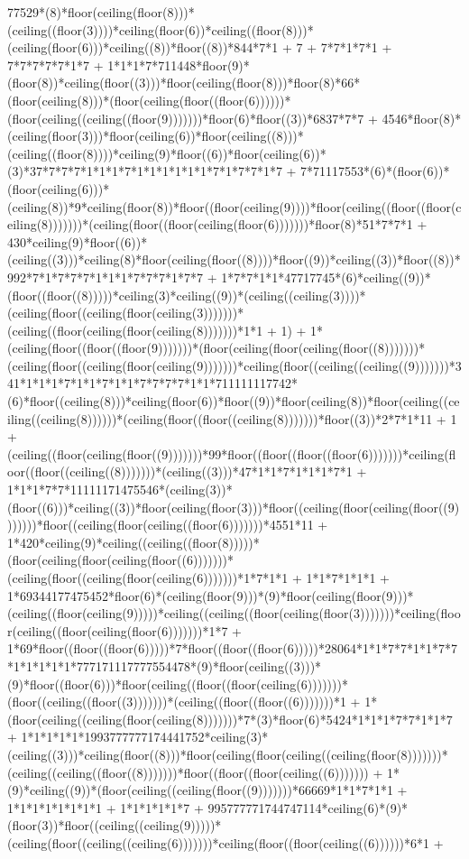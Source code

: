 77529*(8)*floor(ceiling(floor(8)))*(ceiling((floor(3))))*ceiling(floor(6))*ceiling((floor(8)))*(ceiling(floor(6)))*ceiling((8))*floor((8))*844*7*1 + 7 + 7*7*1*7*1 + 7*7*7*7*7*1*7 + 1*1*1*7*711448*floor(9)*(floor(8))*ceiling(floor((3)))*floor(ceiling(floor(8)))*floor(8)*66*(floor(ceiling(8)))*(floor(ceiling(floor((floor(6))))))*(floor(ceiling((ceiling((floor(9)))))))*floor(6)*floor((3))*6837*7*7 + 4546*floor(8)*(ceiling(floor(3)))*floor(ceiling(6))*floor(ceiling((8)))*(ceiling((floor(8))))*ceiling(9)*floor((6))*floor(ceiling(6))*(3)*37*7*7*7*1*1*1*7*1*1*1*1*1*1*7*1*7*7*1*7 + 7*71117553*(6)*(floor(6))*(floor(ceiling(6)))*(ceiling(8))*9*ceiling(floor(8))*floor((floor(ceiling(9))))*floor(ceiling((floor((floor(ceiling(8)))))))*(ceiling(floor((floor(ceiling(floor(6)))))))*floor(8)*51*7*7*1 + 430*ceiling(9)*floor((6))*(ceiling((3)))*ceiling(8)*floor(ceiling(floor((8))))*floor((9))*ceiling((3))*floor((8))*992*7*1*7*7*7*1*1*1*7*7*7*1*7*7 + 1*7*7*1*1*47717745*(6)*ceiling((9))*(floor((floor((8)))))*ceiling(3)*ceiling((9))*(ceiling((ceiling(3))))*(ceiling(floor((ceiling(floor(ceiling(3)))))))*(ceiling((floor(ceiling(floor(ceiling(8)))))))*1*1 + 1) + 1*(ceiling(floor((floor((floor(9)))))))*(floor(ceiling(floor(ceiling(floor((8)))))))*(ceiling(floor((ceiling(floor(ceiling(9)))))))*ceiling(floor((ceiling((ceiling((9)))))))*341*1*1*1*7*1*1*7*1*1*7*7*7*7*1*1*711111117742*(6)*floor((ceiling(8)))*ceiling(floor(6))*floor((9))*floor(ceiling(8))*floor(ceiling((ceiling((ceiling(8))))))*(ceiling(floor((floor((ceiling(8)))))))*floor((3))*2*7*1*11 + 1 + (ceiling((floor(ceiling(floor((9)))))))*99*floor((floor((floor((floor(6)))))))*ceiling(floor((floor((ceiling((8)))))))*(ceiling((3)))*47*1*1*7*1*1*1*7*1 + 1*1*1*7*7*11111171475546*(ceiling(3))*(floor((6)))*ceiling((3))*floor(ceiling(floor(3)))*floor((ceiling(floor(ceiling(floor((9)))))))*floor((ceiling(floor(ceiling((floor(6)))))))*4551*11 + 1*420*ceiling(9)*ceiling((ceiling((floor(8)))))*(floor(ceiling(floor(ceiling(floor((6)))))))*(ceiling(floor((ceiling(floor(ceiling(6)))))))*1*7*1*1 + 1*1*7*1*1*1 + 1*69344177475452*floor(6)*(ceiling(floor(9)))*(9)*floor(ceiling(floor(9)))*(ceiling((floor(ceiling(9)))))*ceiling((ceiling((floor(ceiling(floor(3)))))))*ceiling(floor(ceiling((floor(ceiling(floor(6)))))))*1*7 + 1*69*floor((floor((floor(6)))))*7*floor((floor((floor(6)))))*28064*1*1*7*7*1*1*7*7*1*1*1*1*1*777171117777554478*(9)*floor(ceiling((3)))*(9)*floor((floor(6)))*floor(ceiling((floor((floor(ceiling(6)))))))*(floor((ceiling((floor((3)))))))*(ceiling((floor((floor((6)))))))*1 + 1*(floor(ceiling((ceiling(floor(ceiling(8)))))))*7*(3)*floor(6)*5424*1*1*1*7*7*1*1*7 + 1*1*1*1*1*1993777777174441752*ceiling(3)*(ceiling((3)))*ceiling(floor((8)))*floor(ceiling(floor(ceiling((ceiling(floor(8)))))))*(ceiling((ceiling((floor((8)))))))*floor((floor((floor(ceiling((6))))))) + 1*(9)*ceiling((9))*(floor(ceiling((ceiling(floor((9)))))))*66669*1*1*7*1*1 + 1*1*1*1*1*1*1*1 + 1*1*1*1*1*7 + 995777771744747114*ceiling(6)*(9)*(floor(3))*floor((ceiling((ceiling(9)))))*(ceiling(floor((ceiling((ceiling(6)))))))*ceiling(floor((floor(ceiling((6))))))*6*1 + 
